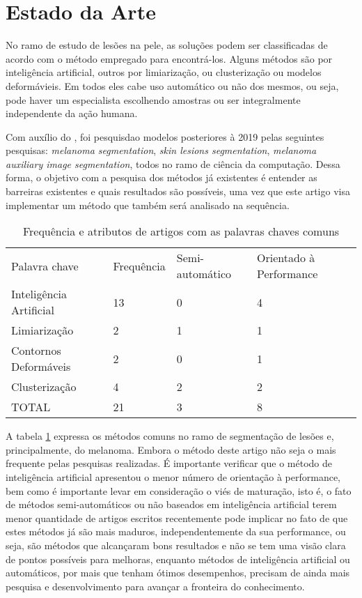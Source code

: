 \section{Estado da Arte}

No ramo de estudo de lesões na pele, as soluções podem ser classificadas de acordo com o método empregado para encontrá-los. Alguns métodos são por inteligência artificial, outros por limiarização, ou clusterização ou modelos deformávieis. Em todos eles cabe uso automático ou não dos mesmos, ou seja, pode haver um especialista escolhendo amostras ou ser integralmente independente da ação humana.

Com auxílio do \cite{arxiv}, foi pesquisdao modelos posteriores à 2019 pelas seguintes pesquisas: \textit{melanoma segmentation}, \textit{skin lesions segmentation}, \textit{melanoma auxiliary image segmentation}, todos no ramo de ciência da computação. Dessa forma, o objetivo com a pesquisa dos métodos já existentes é entender as barreiras existentes e quais resultados são possíveis, uma vez que este artigo visa implementar um método que também será analisado na sequência.

\begin{table}[]
  \begin{tabular}{llll}
    Palavra chave           & Frequência & Semi-automático & Orientado à Performance \\
    Inteligência Artificial & 13         & 0               & 4                       \\
    Limiarização            & 2          & 1               & 1                       \\
    Contornos Deformáveis   & 2          & 0               & 1                       \\
    Clusterização           & 4          & 2               & 2                       \\
    TOTAL                   & 21         & 3               & 8
  \end{tabular}
  \caption{Frequência e atributos de artigos com as palavras chaves comuns}
  \label{table:state-of-art}
\end{table}

A tabela \ref{table:state-of-art} expressa os métodos comuns no ramo de segmentação de lesões e, principalmente, do melanoma. Embora o método deste artigo não seja o mais frequente pelas pesquisas realizadas. É importante verificar que o método de inteligência artificial apresentou o menor número de orientação à performance, bem como é importante levar em consideração o viés de maturação, isto é, o fato de métodos semi-automáticos ou não baseados em inteligência artificial terem menor quantidade de artigos escritos recentemente pode implicar no fato de que estes métodos já são mais maduros, independentemente da sua performance, ou seja, são métodos que alcançaram bons resultados e não se tem uma visão clara de pontos possíveis para melhoras, enquanto métodos de inteligência artificial ou automáticos, por mais que tenham ótimos desempenhos, precisam de ainda mais pesquisa e desenvolvimento para avançar a fronteira do conhecimento.

